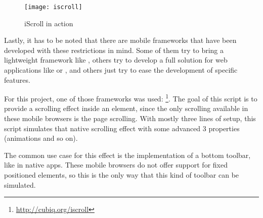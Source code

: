 \begin{wrapfigure}{r}{0.5\textwidth}
  \centering
    \texttt{[image: iscroll]}
  \caption{iScroll in action}
  \label{fig:iscroll}
\end{wrapfigure}

Lastly, it has to be noted that there are mobile  frameworks that have been developed with these restrictions in mind.
Some of them try to bring a lightweight framework like , others try to develop a full solution for web applications like  or , and others just try to ease the development of specific features.

For this project, one of those frameworks was used: \footnote{\url{http://cubiq.org/iscroll}}.
The goal of this script is to provide a scrolling effect inside an element, since the only scrolling available in these mobile browsers is the page scrolling.
With mostly three lines of setup, this script simulates that native scrolling effect with some advanced 3 properties (animations and so on).

The common use case for this effect is the implementation of a bottom toolbar, like in native apps.
These mobile browsers do not offer support for fixed positioned elements, so this is the only way that this kind of toolbar can be simulated.
